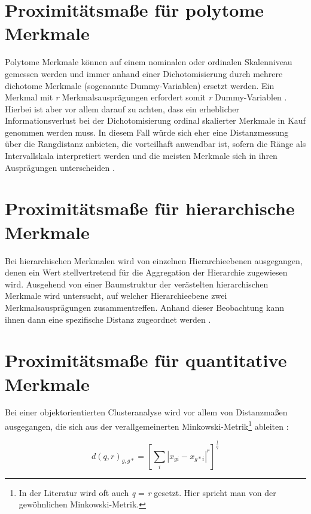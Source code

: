 \section{Proximitätsmaße für polytome Merkmale}
Polytome Merkmale können auf einem nominalen oder ordinalen Skalenniveau gemessen werden und immer anhand einer Dichotomisierung durch mehrere dichotome Merkmale (sogenannte Dummy-Variablen) ersetzt werden. Ein Merkmal mit \textit{r} Merkmalsausprägungen erfordert somit \textit{r} Dummy-Variablen \citep[Vgl.][S. 159]{Bankhofer.2008}. Hierbei ist aber vor allem darauf zu achten, dass ein erheblicher Informationsverlust bei der Dichotomisierung ordinal skalierter Merkmale in Kauf genommen werden muss. In diesem Fall würde sich eher eine Distanzmessung über die Rangdistanz anbieten, die vorteilhaft anwendbar ist, sofern die Ränge als Intervallskala interpretiert werden und die meisten Merkmale sich in ihren Ausprägungen unterscheiden \citep[Vgl.][S. 225]{Eckey.2002}.

\section{Proximitätsmaße für hierarchische Merkmale}

Bei hierarchischen Merkmalen wird von einzelnen Hierarchieebenen ausgegangen, denen ein Wert stellvertretend für die Aggregation der Hierarchie zugewiesen wird. Ausgehend von einer Baumstruktur der verästelten hierarchischen Merkmale wird untersucht, auf welcher Hierarchieebene zwei Merkmalsausprägungen zusammentreffen. Anhand dieser Beobachtung kann ihnen dann eine spezifische Distanz zugeordnet werden \citep[Vgl.][S. 160]{Bankhofer.2008}.

\section{Proximitätsmaße für quantitative Merkmale}
Bei einer objektorientierten Clusteranalyse wird vor allem von Distanzmaßen ausgegangen, die sich aus der verallgemeinerten Minkowski-Metrik\footnote{In der Literatur wird oft auch \textit{q} = \textit{r} gesetzt. Hier spricht man von der gewöhnlichen Minkowski-Metrik.} ableiten \citep[Vgl.][S. 219]{Bacher.2010}:

\begin{equation}
d(q,r)_{g,g*} = 
\left[	\sum_{i} |x_{gi} - x_{g*i}|^r	\right]^\frac{1}{q}
\end{equation}

